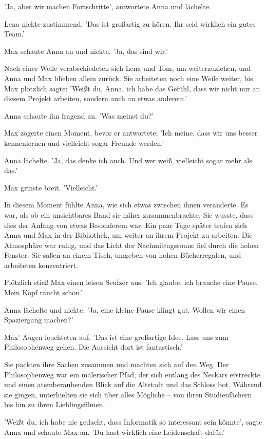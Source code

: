 \documentclass[12pt]{article}
\begin{document}
'Ja, aber wir machen Fortschritte', antwortete Anna und lächelte.

Lena nickte zustimmend. 'Das ist großartig zu hören. Ihr seid wirklich ein gutes Team.'

Max schaute Anna an und nickte. 'Ja, das sind wir.'

Nach einer Weile verabschiedeten sich Lena und Tom, um weiterzuziehen, und Anna und Max blieben allein zurück. Sie arbeiteten noch eine Weile weiter, bis Max plötzlich sagte: 'Weißt du, Anna, ich habe das Gefühl, dass wir nicht nur an diesem Projekt arbeiten, sondern auch an etwas anderem.'

Anna schaute ihn fragend an. 'Was meinst du?'

Max zögerte einen Moment, bevor er antwortete: 'Ich meine, dass wir uns besser kennenlernen und vielleicht sogar Freunde werden.'

Anna lächelte. 'Ja, das denke ich auch. Und wer weiß, vielleicht sogar mehr als das.'

Max grinste breit. 'Vielleicht.'

In diesem Moment fühlte Anna, wie sich etwas zwischen ihnen veränderte. Es war, als ob ein unsichtbares Band sie näher zusammenbrachte. Sie wusste, dass dies der Anfang von etwas Besonderem war. Ein paar Tage später trafen sich Anna und Max in der Bibliothek, um weiter an ihrem Projekt zu arbeiten. Die Atmosphäre war ruhig, und das Licht der Nachmittagssonne fiel durch die hohen Fenster. Sie saßen an einem Tisch, umgeben von hohen Bücherregalen, und arbeiteten konzentriert.

Plötzlich stieß Max einen leisen Seufzer aus. 'Ich glaube, ich brauche eine Pause. Mein Kopf raucht schon.'

Anna lächelte und nickte. 'Ja, eine kleine Pause klingt gut. Wollen wir einen Spaziergang machen?'

Max' Augen leuchteten auf. 'Das ist eine großartige Idee. Lass uns zum Philosophenweg gehen. Die Aussicht dort ist fantastisch.'

Sie packten ihre Sachen zusammen und machten sich auf den Weg. Der Philosophenweg war ein malerischer Pfad, der sich entlang des Neckars erstreckte und einen atemberaubenden Blick auf die Altstadt und das Schloss bot. Während sie gingen, unterhielten sie sich über alles Mögliche – von ihren Studienfächern bis hin zu ihren Lieblingsfilmen.

'Weißt du, ich habe nie gedacht, dass Informatik so interessant sein könnte', sagte Anna und schaute Max an. 'Du hast wirklich eine Leidenschaft dafür.'
\end{document}
